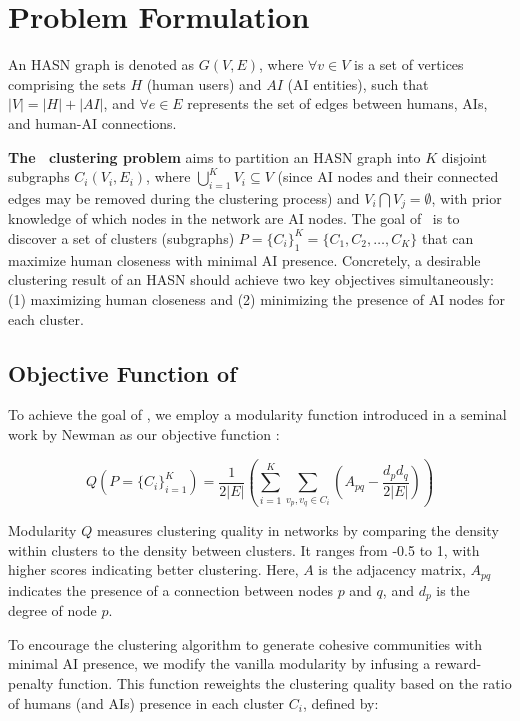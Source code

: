 \section{Problem Formulation}
\label{sec:problem formulation}

An HASN graph is denoted as $G(V, E)$, where $\forall v \in V$ is a set of vertices comprising the sets $H$ (human users) and $AI$ (AI entities), such that $|V| = |H| + |AI|$, and $\forall e \in E$ represents the set of edges between humans, AIs, and human-AI connections. 

\textbf{The \problem\ clustering problem} aims to partition an HASN graph into $K$ disjoint subgraphs $C_i(V_i, E_i)$, where $\bigcup_{i=1}^K V_i \subseteq V$ (since AI nodes and their connected edges may be removed during the clustering process) and $V_i \bigcap V_j = \emptyset$, with prior knowledge of which nodes in the network are AI nodes. The goal of \problem\ is to discover a set of clusters (subgraphs) $P = \{ C_i \}_1^K = \{ C_1, C_2, \ldots, C_K \}$ that can maximize human closeness with minimal AI presence. Concretely, a desirable clustering result of an HASN should achieve two key objectives simultaneously: (1) maximizing human closeness and (2) minimizing the presence of AI nodes for each cluster. 

\subsection{Objective Function of \problem}
\label{subsec:objective_function}

To achieve the goal of \problem, we employ a modularity function introduced in a seminal work by Newman as our objective function \cite{newman2004finding}:

\begin{equation}
Q(P=\{C_i\}_{i=1}^K) = \frac{1}{2|E|} \left( \sum_{i=1}^K \sum_{v_p, v_q \in C_i}\left( A_{pq} - \frac{d_p d_q}{2|E|} \right) \right)
\end{equation}
\vspace{0.5em}

Modularity $Q$ measures clustering quality in networks by comparing the density within clusters to the density between clusters. It ranges from -0.5 to 1, with higher scores indicating better clustering. Here, $A$ is the adjacency matrix, $A_{pq}$ indicates the presence of a connection between nodes $p$ and $q$, and $d_p$ is the degree of node $p$. 

To encourage the clustering algorithm to generate cohesive communities with minimal AI presence, we modify the vanilla modularity by infusing a reward-penalty function. This function reweights the clustering quality based on the ratio of humans (and AIs) presence in each cluster $C_i$, defined by:

